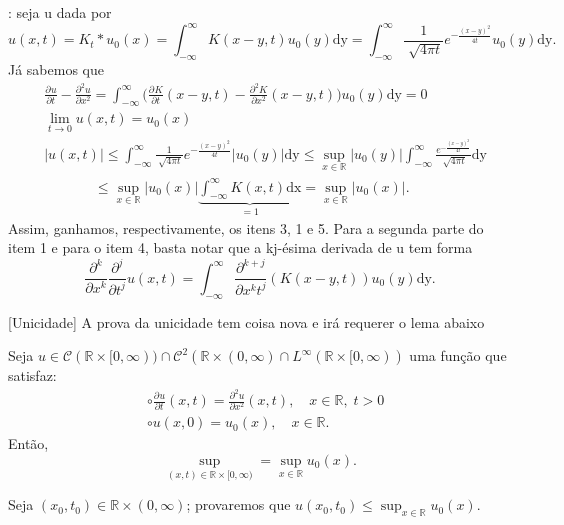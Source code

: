 \documentclass[../pde_notes.tex]{subfiles}
\begin{document}
\begin{proof*}
	: seja u dada por
	\[
		u(x, t) = K_{t}*u_{0}(x) = \int_{-\infty}^{\infty}K(x-y, t)u_{0}(y) \mathrm{dy} = \int_{-\infty}^{\infty}\frac{1}{\sqrt[]{4\pi t}}e^{-\frac{(x-y)^{2}}{4t}}u_{0}(y) \mathrm{dy}.
	\]
	Já sabemos que
	\begin{align*}
		 & \frac{\partial^{}u}{\partial t^{}} - \frac{\partial^{2}u}{\partial x^{2}} = \int_{-\infty}^{\infty}\biggl(\frac{\partial^{}K}{\partial t^{}}(x-y, t) - \frac{\partial^{2}K}{\partial x^{2}}(x-y, t)\biggr)u_{0}(y) \mathrm{dy} = 0      \\
		 & \lim_{t\to 0}u(x, t) = u_{0}(x)                                                                                                                                                                                                         \\
		 & |u(x, t)| \leq \int_{-\infty}^{\infty}\frac{1}{\sqrt[]{4\pi t}}e^{-\frac{(x-y)^{2}}{4t}}|u_{0}(y)| \mathrm{dy}\leq \sup_{x\in \mathbb{R}}|u_{0}(y)|\int_{-\infty}^{\infty}\frac{e^{-\frac{(x-y)^{2}}{4t}}}{\sqrt[]{4\pi t}} \mathrm{dy} \\
		 & \quad\quad\quad\;\; \leq \sup_{x\in \mathbb{R}}|u_{0}(x)|\underbrace{\int_{-\infty}^{\infty}K(x, t) \mathrm{dx}}_{=1} = \sup_{x\in \mathbb{R}}|u_{0}(x)|.
	\end{align*}
	Assim, ganhamos, respectivamente, os itens 3, 1 e 5. Para a segunda parte do item 1 e para o item 4, basta notar que a kj-ésima derivada de u tem forma
	\[
		\frac{\partial^{k}}{\partial x^{k}}\frac{\partial^{j}}{\partial t^{j}}u(x, t) = \int_{-\infty}^{\infty}\frac{\partial^{k+j}}{\partial x^{k}t^{j}}(K(x-y, t))u_{0}(y) \mathrm{dy}.
	\]

	[Unicidade] A prova da unicidade tem coisa nova e irá requerer o lema abaixo
	\begin{lemma*}
		Seja \(u\in \mathcal{C}(\mathbb{R}\times [0, \infty))\cap \mathcal{C}^{2}(\mathbb{R}\times (0, \infty)\cap L^{\infty}(\mathbb{R}\times [0, \infty))\) uma função que satisfaz:
		\begin{align*}
			 & \circ \frac{\partial^{}u}{\partial t^{}}(x, t) = \frac{\partial^{2}u}{\partial x^{2}}(x, t),\quad x\in \mathbb{R},\; t > 0 \\
			 & \circ u(x, 0) = u_{0}(x),\quad x\in \mathbb{R}.
		\end{align*}
		Então,
		\[
			\sup_{(x, t)\in \mathbb{R}\times [0, \infty)} = \sup_{x\in \mathbb{R}}u_{0}(x).
		\]
	\end{lemma*}
	\begin{proof*}[Lema]
		Seja \((x_{0}, t_{0})\in \mathbb{R}\times (0, \infty)\); provaremos que \(u(x_{0}, t_{0})\leq \sup_{x\in \mathbb{R}}u_{0}(x)\).


\end{proof*}
\end{proof*}
\end{document}
